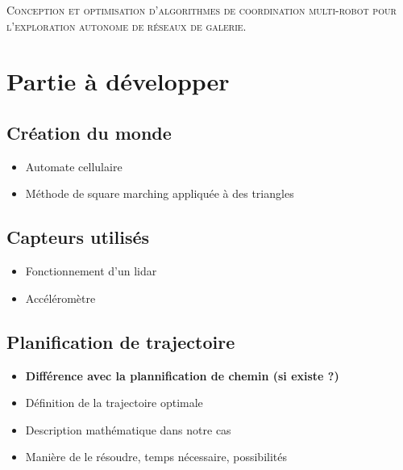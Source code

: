 \documentclass{article}
\numberwithin{figure}{section}
\numberwithin{table}{section}
\begin{document}
\begin{titlepage}
    \begin{center}
        \Large
        \vfill
        \textsc{Conception et optimisation d'algorithmes de coordination multi-robot pour l'exploration autonome de réseaux de galerie.}
        \vfill
    \end{center}
\end{titlepage}
\newpage



\newpage



\newpage



\newpage

\section{Partie à développer}

\subsection*{Création du monde}
\begin{itemize}
    \item Automate cellulaire
    \item Méthode de square marching appliquée à des triangles
\end{itemize}

\subsection*{Capteurs utilisés}
\begin{itemize}
    \item Fonctionnement d'un lidar
    \item Accéléromètre
\end{itemize}

\subsection*{Planification de trajectoire}
\begin{itemize}
	\item \textbf{Différence avec la plannification de chemin (si existe ?)}
    \item Définition de la trajectoire optimale
    \item Description mathématique dans notre cas
    \item Manière de le résoudre, temps nécessaire, possibilités
\end{itemize}
\end{document}
